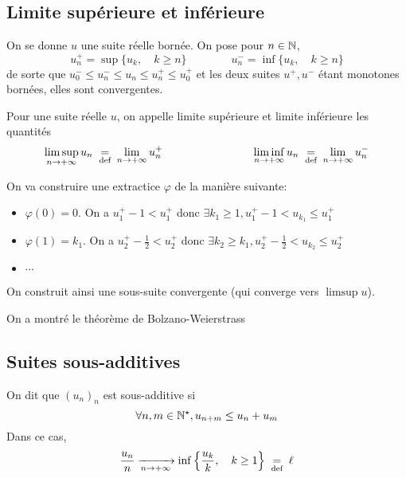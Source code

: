 \subsection{Limite supérieure et inférieure}

On se donne $u$ une suite réelle bornée. On pose pour $n\in\mathbb N$, \[
    u_n^+=\sup\{u_k, \quad k\geq n\}\qquad \qquad u_n^-=\inf \{u_k,\quad k\geq n\}
\]
de sorte que $u_0^-\leq u_n^-\leq u_n\leq u_n^+\leq u_0^+$ et les deux suites $u^+, u^-$ étant monotones bornées, elles sont convergentes.

\begin{dfn}
    Pour une suite réelle $u$, on appelle limite supérieure et limite inférieure les quantités \[
        \limsup_{n\to+\infty}u_n\;\underset{\text{def}}=\;\lim_{n\to+\infty}u_n^+\qquad\qquad\qquad\qquad \liminf_{n\to+\infty}u_n\;\underset{\text{def}}=\;\lim_{n\to+\infty}u_n^-
    \]
\end{dfn}

On va construire une extractice $\varphi$ de la manière suivante: \begin{itemize}
    \item $\varphi(0)=0$. On a $u_1^+-1<u_1^+$ donc $\exists k_1\geq 1, u_1^+-1<u_{k_1}\leq u_1^+$
    \item $\varphi(1)=k_1$. On a $u_2^+-\frac12<u_2^+$ donc $\exists k_2\geq k_1, u_2^+-\frac12<u_{k_2}\leq u_2^+$
    \item $\cdots$
\end{itemize}
On construit ainsi une sous-suite convergente (qui converge vers $\limsup u$).

\begin{rem}
    On a montré le théorème de Bolzano-Weierstrass
\end{rem}

\needspace{5cm}
\subsection{Suites sous-additives}

\begin{res}
    On dit que $(u_n)_n$ est sous-additive si \[
        \forall n, m\in\mathbb N^\star, u_{n+m}\leq u_n+u_m
    \]
    Dans ce cas, \[
        \frac{u_n}n\xrightarrow[n\to+\infty]{}\inf\left\{\frac{u_k}k, \quad k\geq 1\right\}\;\underset{\text{def}}=\;\ell
    \]
\end{res}

